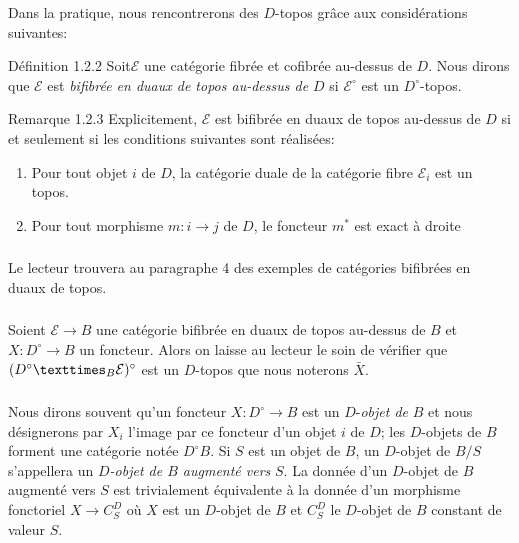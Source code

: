 \documentclass[10pt]{../fichiers-configuration-latex/smfart}
\begin{document}
Dans la pratique, nous rencontrerons des $D$-topos grâce aux
considérations suivantes:

\begin{enonce*}{Définition 1.2.2}
Soit\pageoriginale $\mathcal{E}$ une catégorie fibrée et cofibrée
au-dessus de $D$. Nous dirons que $\mathcal{E}$ est \emph{bifibrée en duaux
de topos au-dessus de $D$} si $\mathcal{E}^{\circ}$ est un
$D^{\circ}$-topos.
\end{enonce*}

\begin{enonce*}[remark]{Remarque 1.2.3}
Explicitement, $\mathcal{E}$ est bifibrée en duaux de topos au-dessus
de $D$ si et seulement si les conditions suivantes sont réalisées:
\begin{enumerate}
\renewcommand{\theenumi}{\alph{enumi}}
\renewcommand{\labelenumi}{(\theenumi)}
\item Pour tout objet $i$ de $D$, la catégorie duale
     de la catégorie fibre
    $\mathcal{E}_i$ est un topos.

\item Pour tout morphisme $m : i \to j$ de $D$, le foncteur $m^{\ast}$ est exact à
    droite
\end{enumerate}
\end{enonce*}

\setcounter{subsection}{2}
\setcounter{subsubsection}{3}
\subsubsection{}
Le lecteur trouvera au paragraphe 4 des exemples de catégories
bifibrées en duaux de topos.

\subsubsection{}
Soient $\mathcal{E} \to B$ une catégorie bifibrée en duaux de topos
au-dessus de $B$ et $X : D^{\circ} \to B$ un foncteur. Alors on laisse
au lecteur le soin de vérifier que
$(\fprod{D^{\circ}}{\mathcal{E}}{B})^{\circ}$ est un $D$-topos que
nous noterons $\bar{X}$.

\subsubsection{}
Nous dirons souvent qu'un foncteur $X : D^{\circ} \to B$ est un
$D$-\emph{objet de} $B$ et nous désignerons par $X_i$ l'image par ce
foncteur d'un objet $i$ de $D$; les $D$-objets de $B$ forment une
catégorie notée $D^{\circ}B$. Si $S$ est un objet de $B$, un
$D$-objet de $B/S$ s'appellera un \emph{$D$-objet de $B$ augmenté
  vers} $S$. La donnée d'un $D$-objet de $B$ augmenté vers $S$ est
trivialement équivalente à la donnée d'un morphisme
fonctoriel $X \to C^{D}_S$ où $X$ est un $D$-objet de $B$ et $C^D_S$
le $D$-objet de $B$ constant de valeur $S$.
\end{document}
